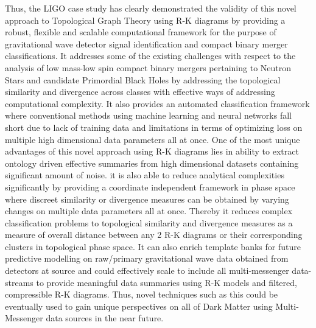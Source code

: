 Thus, the LIGO case study has clearly demonstrated the validity of this novel approach to Topological Graph Theory using R-K diagrams by providing a robust, flexible and scalable computational framework for the purpose of gravitational wave detector signal identification and compact binary merger classifications. It addresses some of the existing challenges with respect to the analysis of low mass-low spin compact binary mergers pertaining to Neutron Stars and candidate Primordial Black Holes by addressing the topological similarity and divergence across classes with effective ways of addressing computational complexity. It also provides an automated classification framework where conventional methods using machine learning and neural networks fall short due to lack of training data and limitations in terms of optimizing loss on multiple high dimensional data parameters all at once. One of the most unique advantages of this novel approach using R-K diagrams lies in ability to extract ontology driven effective summaries from high dimensional datasets containing significant amount of noise. it is also able to reduce analytical complexities significantly by providing a coordinate independent framework in phase space where discreet similarity or divergence measures can be obtained by varying changes on multiple data parameters all at once. Thereby it reduces complex classification problems to topological similarity and divergence measures as a measure of overall distance between any 2 R-K diagrams or their corresponding clusters in topological phase space. It can also enrich template banks for future predictive modelling on raw/primary gravitational wave data obtained from detectors at source and could effectively scale to include all multi-messenger data-streams to provide meaningful data summaries using R-K models and filtered, compressible R-K diagrams. Thus, novel techniques such as this could be eventually used to gain unique perspectives on all of Dark Matter using Multi-Messenger data sources in the near future.
